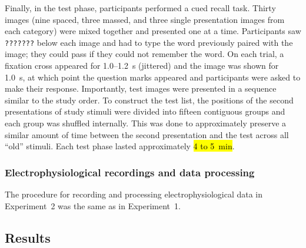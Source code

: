 
Finally, in the test phase, participants performed a cued recall task.  Thirty images (nine spaced, three massed, and three single presentation images from each category) were mixed together and presented one at a time.  Participants saw \texttt{???????} below each image and had to type the word previously paired with the image; they could pass if they could not remember the word.  On each trial, a fixation cross appeared for 1.0--1.2~s (jittered) and the image was shown for 1.0~s, at which point the question marks appeared and participants were asked to make their response.  Importantly, test images were presented in a sequence similar to the study order.  To construct the test list, the positions of the second presentations of study stimuli were divided into fifteen contiguous groups and each group was shuffled internally.  This was done to approximately preserve a similar amount of time between the second presentation and the test across all ``old'' stimuli.  Each test phase lasted approximately \hl{4 to 5~min}.



\subsubsection{Electrophysiological recordings and data processing}

The procedure for recording and processing electrophysiological data
in Experiment~2 was the same as in Experiment~1.

\subsection{Results}



